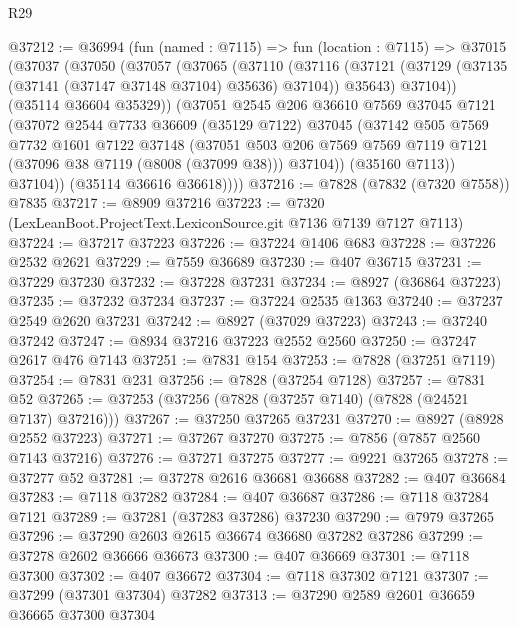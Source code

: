 \begin{lexlean}{R29}
\begin{coremodule}
@37212 := @36994
    (fun (named : @7115) =>
    fun (location : @7115) =>
    @37015
      (@37037
        (@37050
          (@37057
            (@37065
              (@37110
                (@37116
                  (@37121 (@37129 (@37135 (@37141 (@37147 @37148 @37104) @35636) @37104)) @35643)
                  @37104))
              (@35114 @36604 @35329))
            (@37051
              @2545
              @206
              @36610
              @7569
              @37045
              @7121
              (@37072
                @2544
                @7733
                @36609
                (@35129 @7122)
                @37045
                (@37142
                  @505
                  @7569
                  @7732
                  @1601
                  @7122
                  @37148
                  (@37051
                    @503
                    @206
                    @7569
                    @7569
                    @7119
                    @7121
                    (@37096 @38 @7119 (@8008 (@37099 @38)))
                    @37104))
                (@35160 @7113))
              @37104))
          (@35114 @36616 @36618))))
@37216 := @7828 (@7832 (@7320 @7558)) @7835
@37217 := @8909 @37216
@37223 := @7320 (LexLeanBoot.ProjectText.LexiconSource.git @7136 @7139 @7127 @7113)
@37224 := @37217 @37223
@37226 := @37224 @1406 @683
@37228 := @37226 @2532 @2621
@37229 := @7559 @36689
@37230 := @407 @36715
@37231 := @37229 @37230
@37232 := @37228 @37231
@37234 := @8927 (@36864 @37223)
@37235 := @37232 @37234
@37237 := @37224 @2535 @1363
@37240 := @37237 @2549 @2620 @37231
@37242 := @8927 (@37029 @37223)
@37243 := @37240 @37242
@37247 := @8934 @37216 @37223 @2552 @2560
@37250 := @37247 @2617 @476 @7143
@37251 := @7831 @154
@37253 := @7828 (@37251 @7119)
@37254 := @7831 @231
@37256 := @7828 (@37254 @7128)
@37257 := @7831 @52
@37265 := @37253 (@37256 (@7828 (@37257 @7140) (@7828 (@24521 @7137) @37216)))
@37267 := @37250 @37265 @37231
@37270 := @8927 (@8928 @2552 @37223)
@37271 := @37267 @37270
@37275 := @7856 (@7857 @2560 @7143 @37216)
@37276 := @37271 @37275
@37277 := @9221 @37265
@37278 := @37277 @52
@37281 := @37278 @2616 @36681 @36688
@37282 := @407 @36684
@37283 := @7118 @37282
@37284 := @407 @36687
@37286 := @7118 @37284 @7121
@37289 := @37281 (@37283 @37286) @37230
@37290 := @7979 @37265
@37296 := @37290 @2603 @2615 @36674 @36680 @37282 @37286
@37299 := @37278 @2602 @36666 @36673
@37300 := @407 @36669
@37301 := @7118 @37300
@37302 := @407 @36672
@37304 := @7118 @37302 @7121
@37307 := @37299 (@37301 @37304) @37282
@37313 := @37290 @2589 @2601 @36659 @36665 @37300 @37304

\end{coremodule}
\end{lexlean}
